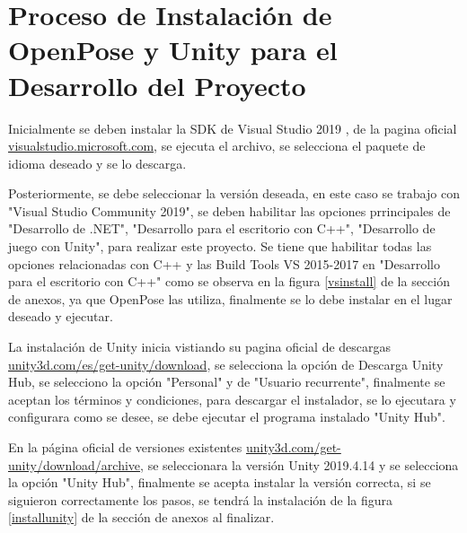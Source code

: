 \section{Proceso de Instalación de OpenPose y Unity para el Desarrollo del Proyecto}

Inicialmente se deben instalar la SDK de Visual Studio 2019 , de la pagina oficial  \href{https://visualstudio.microsoft.com/es/thank-you-downloading-visual-studio/?sku=Community&rel=16}{visualstudio.microsoft.com}, se ejecuta el archivo, se selecciona el paquete de idioma deseado y se lo descarga.

Posteriormente, se debe seleccionar la versión deseada, en este caso se trabajo con "Visual Studio Community 2019", se deben habilitar las opciones prrincipales de "Desarrollo de .NET", "Desarrollo para el escritorio con C++", "Desarrollo de juego con Unity", para realizar este proyecto. Se tiene que habilitar todas las opciones relacionadas con C++ y las Build Tools VS 2015-2017 en "Desarrollo para el escritorio con C++" como se observa en la figura \ref{vsinstall} de la sección de anexos, ya que OpenPose las utiliza, finalmente se lo debe instalar en el lugar deseado y ejecutar.

La instalación de Unity inicia vistiando su pagina oficial de descargas  \href{https://unity3d.com/es/get-unity/download}{unity3d.com/es/get-unity/download}, se selecciona la opción de Descarga Unity Hub, se selecciono la opción "Personal" y de "Usuario recurrente", finalmente se aceptan los términos y condiciones, para descargar el instalador, se lo ejecutara y configurara como se desee, se debe ejecutar el programa instalado "Unity Hub".  

En la página oficial de versiones existentes \href{https://unity3d.com/get-unity/download/archive}{unity3d.com/get-unity/download/archive}, se seleccionara la versión Unity 2019.4.14 y se selecciona la opción "Unity Hub", finalmente se acepta instalar la versión correcta, si se siguieron correctamente los pasos, se tendrá la instalación de la figura \ref{installunity} de la sección de anexos al finalizar.

